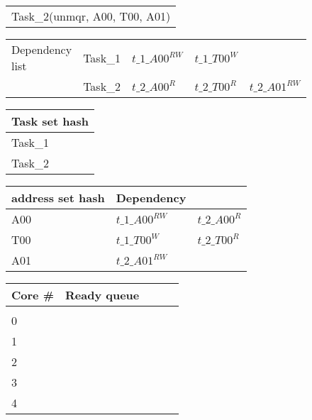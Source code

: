 \documentclass{article}
\begin{document}
\begin{figure}
\begin{minipage}{1.0\linewidth}
\begin{tabular}{l}
Task\_2(unmqr, A00, T00, A01)
\end{tabular}
\end{minipage}

\begin{minipage}{1.0\linewidth}
\begin{tabular}{l | l l l l}
Dependency list & Task\_1 & \cellcolor{LimeGreen} $t\_1\_A00^{RW}$ & \cellcolor{LimeGreen} $t\_1\_T00^{W}$ &\\
                & Task\_2 & \cellcolor{RedOrange}$t\_2\_A00^{R}$ & \cellcolor{RedOrange}$t\_2\_T00^{R}$ & \cellcolor{LimeGreen}$t\_2\_A01^{RW}$\\
\end{tabular}
\end{minipage}

\begin{minipage}{1.0\linewidth}
\begin{tabular}{l}
Task set hash\\
\hline
\cellcolor{LimeGreen}Task\_1\\
\cellcolor{RedOrange}Task\_2\\
\end{tabular}
\end{minipage}

\begin{minipage}{1.0\linewidth}
\begin{tabular}{l | l l}
address set hash& Dependency&\\
\hline
A00 & \cellcolor{LimeGreen} $t\_1\_A00^{RW}$ & \cellcolor{RedOrange}$t\_2\_A00^{R}$\\
T00 & \cellcolor{LimeGreen} $t\_1\_T00^{W}$ & \cellcolor{RedOrange}$t\_2\_T00^{R}$\\
A01 & \cellcolor{LimeGreen} $t\_2\_A01^{RW}$ &\\
\end{tabular}
\end{minipage}

\begin{minipage}{1.0\linewidth}
\begin{tabular}{l | l l l l}
Core \# & Ready queue\\
\hline
&\\
0 & & & &\\
1 & & & &\\
2 & & & &\\
3 & & & &\\
4 & & & &\\
\end{tabular}
\end{minipage}


\end{figure}
\end{document}
